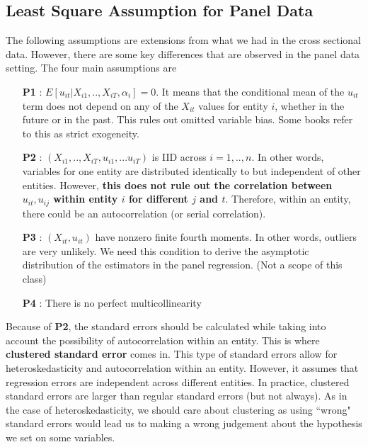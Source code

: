 \subsection{Least Square Assumption for Panel Data}
The following assumptions are extensions from what we had in the cross sectional data. However, there are some key differences that are observed in the panel data setting. The four main assumptions are
\begin{itemize}
\item [\textbf{P1}]: $E[u_{it}|X_{i1},..,X_{iT},\alpha_i]=0$. It means that the conditional mean of the $u_{it}$ term does not depend on any of the $X_{it}$ values for entity $i$, whether in the future or in the past. This rules out omitted variable bias. Some books refer to this as strict exogeneity. 
\item [\textbf{P2}]: $(X_{i1},..,X_{iT},u_{i1},...u_{iT})$ is IID across $i=1,..,n$. In other words, variables for one entity are distributed identically to but independent of other entities. However, \textbf{this does not rule out the correlation between $u_{it},u_{ij}$ within entity $i$ for different $j$ and $t$}. Therefore, within an entity, there could be an autocorrelation (or serial correlation).  
\item [\textbf{P3}]: $(X_{it},u_{it})$ have nonzero finite fourth moments. In other words, outliers are very unlikely. We need this condition to derive the asymptotic distribution of the estimators in the panel regression. (Not a scope of this class)
\item [\textbf{P4}]: There is no perfect multicollinearity
\end{itemize}
Because of \textbf{P2}, the standard errors should be calculated while taking into account the possibility of autocorrelation within an entity. This is where \textbf{clustered standard error} comes in. This type of standard errors allow for heteroskedasticity and autocorrelation within an entity. However, it assumes that regression errors are independent across different entities. In practice, clustered standard errors are larger than regular standard errors (but not always). As in the case of heteroskedasticity, we should care about clustering as using ``wrong" standard errors would lead us to making a wrong judgement about the hypothesis we set on some variables. \par\medskip



